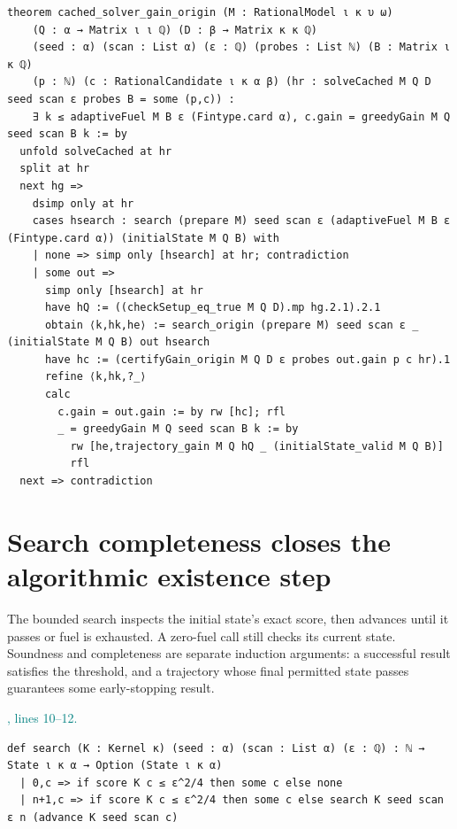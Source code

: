 \documentclass[11pt]{article}\usepackage{needspace}\renewcommand{\paperkind}{Lean companion}\setlength{\parskip}{0.35em}
\begin{document}
\begin{lstlisting}[style=BayesSource]
theorem cached_solver_gain_origin (M : RationalModel ι κ υ ω)
    (Q : α → Matrix ι ι ℚ) (D : β → Matrix κ κ ℚ)
    (seed : α) (scan : List α) (ε : ℚ) (probes : List ℕ) (B : Matrix ι κ ℚ)
    (p : ℕ) (c : RationalCandidate ι κ α β) (hr : solveCached M Q D seed scan ε probes B = some (p,c)) :
    ∃ k ≤ adaptiveFuel M B ε (Fintype.card α), c.gain = greedyGain M Q seed scan B k := by
  unfold solveCached at hr
  split at hr
  next hg =>
    dsimp only at hr
    cases hsearch : search (prepare M) seed scan ε (adaptiveFuel M B ε (Fintype.card α)) (initialState M Q B) with
    | none => simp only [hsearch] at hr; contradiction
    | some out =>
      simp only [hsearch] at hr
      have hQ := ((checkSetup_eq_true M Q D).mp hg.2.1).2.1
      obtain ⟨k,hk,he⟩ := search_origin (prepare M) seed scan ε _ (initialState M Q B) out hsearch
      have hc := (certifyGain_origin M Q D ε probes out.gain p c hr).1
      refine ⟨k,hk,?_⟩
      calc
        c.gain = out.gain := by rw [hc]; rfl
        _ = greedyGain M Q seed scan B k := by
          rw [he,trajectory_gain M Q hQ _ (initialState_valid M Q B)]
          rfl
  next => contradiction
\end{lstlisting}

\section{Search completeness closes the algorithmic existence step}

The bounded search inspects the initial state's exact score, then advances until it passes or fuel is exhausted. A zero-fuel call still checks its current state. Soundness and completeness are separate induction arguments: a successful result satisfies the threshold, and a trajectory whose final permitted state passes guarantees some early-stopping result.



{\small\textcolor{teal}{, lines 10--12.}\par}

\begin{lstlisting}[style=BayesSource]
def search (K : Kernel κ) (seed : α) (scan : List α) (ε : ℚ) : ℕ → State ι κ α → Option (State ι κ α)
  | 0,c => if score K c ≤ ε^2/4 then some c else none
  | n+1,c => if score K c ≤ ε^2/4 then some c else search K seed scan ε n (advance K seed scan c)
\end{lstlisting}
\end{document}
